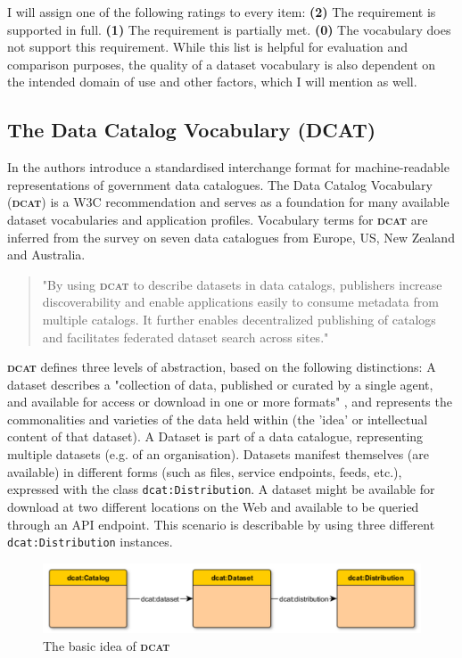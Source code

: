 \documentclass[a4paper,english,twoside,BCOR1.5cm,headsepline,DIV12,appendixprefix,final,12pt]{scrbook}
\newcommand{\dcat}{{\scshape\bfseries dcat}\xspace}
\newcommand{\prop}[1]{{{\texttt{#1}}}}
\begin{document}
I will assign one of the following ratings to every item: \textbf{(2)} The requirement is supported in full. \textbf{(1)} The requirement is partially met. \textbf{(0)} The vocabulary does not support this requirement. 
While this list is helpful for evaluation and comparison purposes, the quality of a dataset vocabulary is also dependent on the intended domain of use and other factors, which I will mention as well.

\subsection{The Data Catalog Vocabulary (DCAT)}
\label{sec:dcat}
In \cite{MaaliCP10} the authors introduce a standardised interchange format for machine-readable representations of government data catalogues. The Data Catalog Vocabulary (\dcat) is a W3C recommendation \cite{ddcat} and serves as a foundation for many available dataset vocabularies and application profiles.
Vocabulary terms for \dcat are inferred from the survey on seven data catalogues from Europe, US, New Zealand and Australia.

\begin{quote}
"By using \dcat to describe datasets in data catalogs, publishers increase discoverability and enable applications easily to consume metadata from multiple catalogs. It further enables decentralized publishing of catalogs and facilitates federated dataset search across sites." \cite{ddcat}
\end{quote}

\dcat defines three levels of abstraction, based on the following distinctions: A dataset describes a "collection of data, published or curated by a single agent, and available for access or download in one or more formats" \cite{ddcat}, and represents the commonalities and varieties of the data held within (the 'idea' or intellectual content of that dataset). A Dataset is part of a data catalogue, representing multiple datasets (e.g. of an organisation). Datasets manifest themselves (are available) in different forms (such as files, service endpoints, feeds, etc.), expressed with the class \prop{dcat:Distribution}. A dataset might be available for download at two different locations on the Web and available to be queried through an API endpoint. This scenario is describable by using three different \prop{dcat:Distribution} instances.

\begin{figure}[!htbp]
\centering
  \includegraphics[width=\textwidth]{images/DcatIdea.png}
  \caption{The basic idea of \dcat}
  \label{fig:dcat}
\end{figure}
\end{document}
